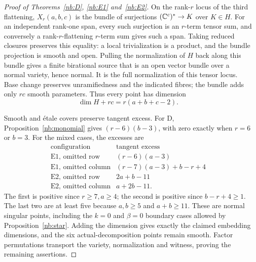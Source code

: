 \begin{proof}[Proof of Theorems~\ref{nb:D}, \ref{nb:E1} and~\ref{nb:E2}]
On the rank-$r$ locus of the third flattening, $X_r(a,b,c)$ is the
bundle of surjections $(\mathbb C^c)^*\to K$ over $K\in H$. For an
independent rank-one span, every such surjection is an $r$-term
tensor sum, and conversely a rank-$r$-flattening $r$-term sum gives
such a span. Taking reduced closures preserves this equality: a
local trivialization is a product, and the bundle projection is
smooth and open. Pulling the normalization of $H$ back along this
bundle gives a finite birational source that is an open vector
bundle over a normal variety, hence normal. It is the full
normalization of this tensor locus. Base change preserves
unramifiedness and the indicated fibres; the bundle adds only $rc$
smooth parameters. Thus every point has dimension
\[
 \dim H+rc=r(a+b+c-2).
\]

Smooth and \'etale covers preserve tangent excess. For D,
Proposition~\ref{nb:monomial} gives $(r-6)(b-3)$, with zero exactly
when $r=6$ or $b=3$. For the mixed cases, the excesses are
\[
 \begin{array}{c|c}
 \text{configuration}&\text{tangent excess}\\ \hline
 \text{E1, omitted row}&(r-6)(a-3)\\
 \text{E1, omitted column}&(r-7)(a-3)+b-r+4\\
 \text{E2, omitted row}&2a+b-11\\
 \text{E2, omitted column}&a+2b-11.
 \end{array}
\]
The first is positive since $r\geq7,a\geq4$; the second is
positive since $b-r+4\geq1$. The last two are at least five
because $a,b\geq5$ and $a+b\geq11$. These are normal singular
points, including the $k=0$ and $\beta=0$ boundary cases allowed
by Proposition~\ref{nb:star}. Adding the dimension gives exactly
the claimed embedding dimensions, and the six actual-decomposition
points remain smooth. Factor permutations transport the variety,
normalization and witness, proving the remaining assertions.
\end{proof}
